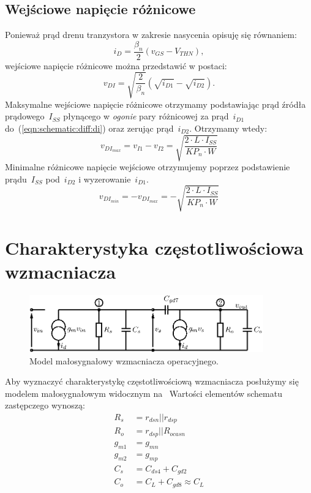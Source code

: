 \documentclass[twoside,pl,final]{labman}
\begin{document}
\subsection{Wejściowe napięcie różnicowe}
\label{schematic:diff}
Ponieważ prąd drenu tranzystora w zakresie nasycenia opisuję się równaniem:
\begin{equation}
  i_D = \frac{\beta_n}{2}(v_{GS} - V_{THN}),
\end{equation}
wejściowe napięcie różnicowe można przedstawić w postaci:
\begin{equation}
  v_{DI} = \sqrt{\frac{2}{\beta_n}}(\sqrt{i_{D1}} - \sqrt{i_{D2}}).
  \label{eqn:schematic:diff:di}
\end{equation}
Maksymalne wejściowe napięcie różnicowe otrzymamy podstawiając prąd źródła
prądowego~$I_{SS}$ płynącego w \emph{ogonie} pary różnicowej
za prąd~$i_{D1}$ do~(\ref{eqn:schematic:diff:di}) oraz zerując prąd~$i_{D2}$.
Otrzymamy wtedy:
\begin{equation}
  v_{DI_{max}} =
  v_{I1} - v_{I2} =
  \sqrt{\frac{2 \cdot L \cdot I_{SS}}{KP_n \cdot W}}
  \label{eqn:schematic:diff:di:max}
\end{equation}
Minimalne różnicowe napięcie wejściowe otrzymujemy poprzez
podstawienie prądu~$I_{SS}$ pod~$i_{D2}$ i wyzerowanie~$i_{D1}$.
\begin{equation}
  v_{DI_{min}} =
  - v_{DI_{max}} =
  - \sqrt{\frac{2 \cdot L \cdot I_{SS}}{KP_n \cdot W}}
\end{equation}

\section{Charakterystyka częstotliwościowa wzmacniacza}
\label{freq}
\begin{figure}[!htbp]
  \centering
  \includegraphics[width=0.9\textwidth]{smallsignal}
  \caption{Model małosygnałowy wzmacniacza operacyjnego.}
  \label{fig:smallsignal}
\end{figure}

Aby wyznaczyć charakterystykę częstotliwościową wzmacniacza posłużymy się
modelem małosygnałowym widocznym na~
Wartości elementów schematu zastępczego wynoszą:
\begin{align}
  R_s &= r_{dsn} || r_{dsp}        \nonumber \\
  R_o &= r_{dsp} || R_{ocasn}      \nonumber \\
  g_{m1} &= g_{mn}                 \nonumber \\
  g_{m2} &= g_{mp}                 \nonumber \\
  C_s &= C_{ds4} + C_{gd2}         \nonumber \\
  C_o &= C_L + C_{gd8} \approx C_L \nonumber
\end{align}
\end{document}
